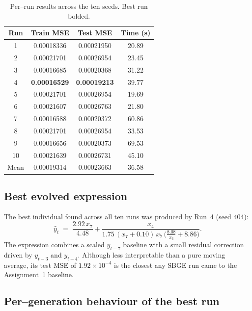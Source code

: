 \documentclass[12pt,a4paper]{article}
\begin{document}
\begin{table}[H]
\centering
\begin{tabular}{c c c c}
\toprule
\textbf{Run} & \textbf{Train MSE} & \textbf{Test MSE} & \textbf{Time (s)} \\
\midrule
1  & 0.00018336 & 0.00021950 & 20.89 \\
2  & 0.00021701 & 0.00026954 & 23.45 \\
3  & 0.00016685 & 0.00020368 & 31.22 \\
4  & \textbf{0.00016529} & \textbf{0.00019213} & 39.77 \\
5  & 0.00021701 & 0.00026954 & 19.69 \\
6  & 0.00021607 & 0.00026763 & 21.80 \\
7  & 0.00016588 & 0.00020372 & 60.86 \\
8  & 0.00021701 & 0.00026954 & 33.53 \\
9  & 0.00016656 & 0.00020373 & 69.53 \\
10 & 0.00021639 & 0.00026731 & 45.10 \\
\midrule
Mean & 0.00019314 & 0.00023663 & 36.58 \\
\bottomrule
\end{tabular}
\caption{Per--run results across the ten seeds. Best run bolded.}
\end{table}

\subsection{Best evolved expression}
The best individual found across all ten runs was produced by Run~4
(seed 404):
\[
\hat{y}_t \;=\; \frac{2.92\,x_7}{4.48} + \frac{x_4}{1.75\,(x_7+0.10)\,x_7\,\bigl(\tfrac{8.08}{x_3} + 8.86\bigr)}.
\]
The expression combines a scaled $y_{t-7}$ baseline with a small
residual correction driven by $y_{t-3}$ and $y_{t-4}$. Although less
interpretable than a pure moving average, its test MSE of
$1.92 \times 10^{-4}$ is the closest any SBGE run came to the
Assignment~1 baseline.

\subsection{Per--generation behaviour of the best run}
\end{document}
